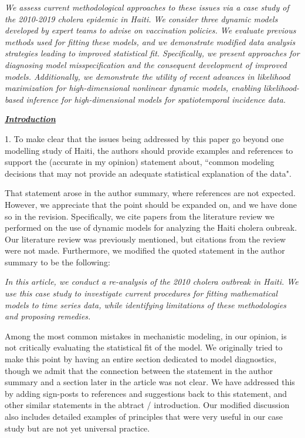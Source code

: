 \documentclass[11pt]{article}
\newcommand\report[1]{{\color{mygreen} \vspace{1mm}\hspace{0.25in}\parbox{6in}{\em #1}}}
\newcommand\article[1]{{\color{blue} \vspace{1mm}\hspace{0.25in}\parbox{6in}{\em #1}}}
\begin{document}
\article{We assess current methodological approaches to these issues via a case study of the 2010-2019 cholera epidemic in Haiti. We consider three dynamic models developed by expert teams to advise on vaccination policies. We evaluate previous methods used for fitting these models, and we demonstrate modified data analysis strategies leading to improved statistical fit. Specifically, we present approaches for diagnosing model misspecification and the consequent development of improved models. Additionally, we demonstrate the utility of recent advances in likelihood maximization for high-dimensional nonlinear dynamic models, enabling likelihood-based inference for high-dimensional models for spatiotemporal incidence data.}

\report{
  \textbf{\underline{Introduction}}

1.  To make clear that the issues being addressed by this paper go beyond one modelling study of Haiti, the authors should provide examples and references to support the (accurate in my opinion) statement about, ``common modeling decisions that may not provide an adequate statistical explanation of the data".
}

That statement arose in the author summary, where references are not expected.
However, we appreciate that the point should be expanded on, and we have done so in the revision. Specifically, we cite papers from the literature review we performed on the use of dynamic models for analyzing the Haiti cholera oubreak. Our literature review was previously mentioned, but citations from the review were not made. Furthermore, we modified the quoted statement in the author summary to be the following:

\article{In this article, we conduct a re-analysis of the 2010 cholera outbreak in Haiti. We use this case study to investigate current procedures for fitting mathematical models to time series data, while identifying limitations of these methodologies and proposing remedies.}

Among the most common mistakes in mechanistic modeling, in our opinion, is not critically evaluating the statistical fit of the model.
We originally tried to make this point by having an entire section dedicated to model diagnostics, though we admit that the connection between the statement in the author summary and a section later in the article was not clear.
We have addressed this by adding sign-posts to references and suggestions back to this statement, and other similar statements in the abtract / introduction.
Our modified discussion also includes detailed examples of principles that were very useful in our case study but are not yet universal practice.
\end{document}
